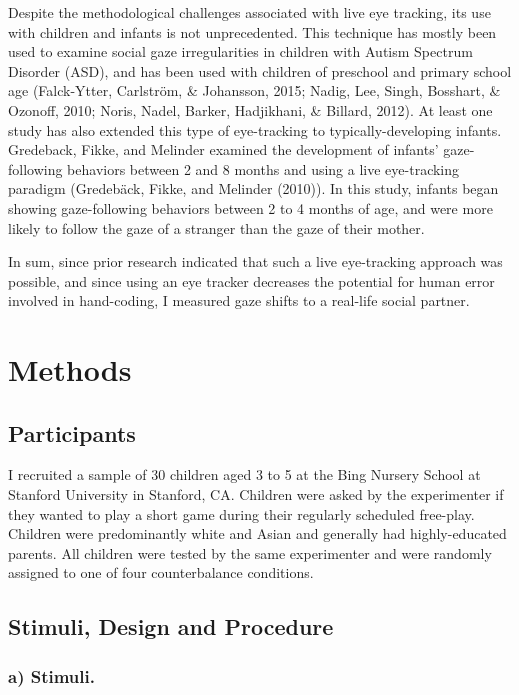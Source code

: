 \documentclass[man]{apa6}
\theoremstyle{definition}
\theoremstyle{definition}
\theoremstyle{definition}
\theoremstyle{remark}
\begin{document}
Despite the methodological challenges associated with live eye tracking,
its use with children and infants is not unprecedented. This technique
has mostly been used to examine social gaze irregularities in children
with Autism Spectrum Disorder (ASD), and has been used with children of
preschool and primary school age (Falck-Ytter, Carlström, \& Johansson,
2015; Nadig, Lee, Singh, Bosshart, \& Ozonoff, 2010; Noris, Nadel,
Barker, Hadjikhani, \& Billard, 2012). At least one study has also
extended this type of eye-tracking to typically-developing infants.
Gredeback, Fikke, and Melinder examined the development of infants'
gaze-following behaviors between 2 and 8 months and using a live
eye-tracking paradigm (Gredebäck, Fikke, and Melinder (2010)). In this
study, infants began showing gaze-following behaviors between 2 to 4
months of age, and were more likely to follow the gaze of a stranger
than the gaze of their mother.

In sum, since prior research indicated that such a live eye-tracking
approach was possible, and since using an eye tracker decreases the
potential for human error involved in hand-coding, I measured gaze
shifts to a real-life social partner.

\section{Methods}\label{methods}

\subsection{Participants}\label{participants}

I recruited a sample of 30 children aged 3 to 5 at the Bing Nursery
School at Stanford University in Stanford, CA. Children were asked by
the experimenter if they wanted to play a short game during their
regularly scheduled free-play. Children were predominantly white and
Asian and generally had highly-educated parents. All children were
tested by the same experimenter and were randomly assigned to one of
four counterbalance conditions.

\subsection{Stimuli, Design and
Procedure}\label{stimuli-design-and-procedure}

\subsubsection{a) Stimuli.}\label{a-stimuli.}
\end{document}
